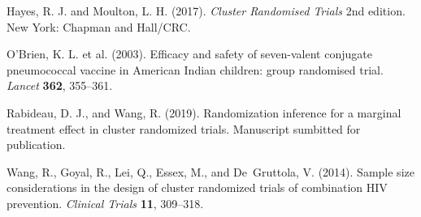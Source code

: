 \documentclass[12pt]{article}\usepackage[]{graphicx}\usepackage[]{color}
\begin{document}
\noindent\hangindent=15pt Hayes, R. J. and Moulton, L. H. (2017). \textit{Cluster Randomised Trials} 2nd edition. New York: Chapman and Hall/CRC.

\noindent\hangindent=15pt O'Brien, K. L. et al. (2003). Efficacy and safety of seven-valent conjugate pneumococcal vaccine in American Indian children: group randomised trial. \textit{Lancet} \textbf{362}, 355--361.

\noindent\hangindent=15pt Rabideau, D. J., and Wang, R. (2019). Randomization inference for a marginal treatment effect in cluster randomized trials. Manuscript sumbitted for publication.

\noindent\hangindent=15pt Wang, R., Goyal, R., Lei, Q., Essex, M., and De~Gruttola, V. (2014). Sample size considerations in the design of cluster randomized trials of combination HIV prevention. \textit{Clinical Trials} \textbf{11}, 309--318.
\end{document}
